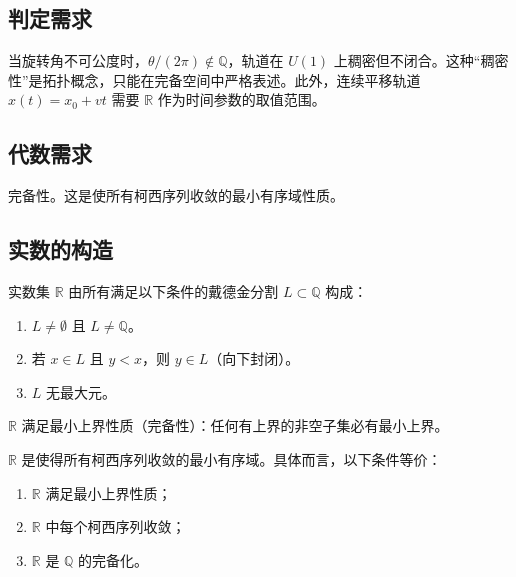 \subsection{\texorpdfstring{判定需求}{判定需求}}

当旋转角不可公度时，$\theta/(2\pi) \notin \mathbb{Q}$，轨道在 $U(1)$ 上稠密但不闭合。这种“稠密性”是拓扑概念，只能在完备空间中严格表述。此外，连续平移轨道 $x(t) = x_0 + vt$ 需要 $\mathbb{R}$ 作为时间参数的取值范围。

\subsection{\texorpdfstring{代数需求}{代数需求}}

完备性。这是使所有柯西序列收敛的最小有序域性质。

\subsection{\texorpdfstring{实数的构造}{实数的构造}}

\begin{definition}[实数的构造]\label{def:real_construction}
实数集 $\mathbb{R}$ 由所有满足以下条件的戴德金分割 $L \subset \mathbb{Q}$ 构成：
\begin{enumerate}[label=(\arabic*)]
    \item $L \neq \emptyset$ 且 $L \neq \mathbb{Q}$。
    \item 若 $x \in L$ 且 $y < x$，则 $y \in L$（向下封闭）。
    \item $L$ 无最大元。
\end{enumerate}
$\mathbb{R}$ 满足最小上界性质（完备性）：任何有上界的非空子集必有最小上界。
\end{definition}

\begin{theorem}[实数完备性定理]\label{thm:real_completeness}
$\mathbb{R}$ 是使得所有柯西序列收敛的最小有序域。具体而言，以下条件等价：
\begin{enumerate}[label=(\roman*)]
    \item $\mathbb{R}$ 满足最小上界性质；
    \item $\mathbb{R}$ 中每个柯西序列收敛；
    \item $\mathbb{R}$ 是 $\mathbb{Q}$ 的完备化。
\end{enumerate}
\end{theorem}

